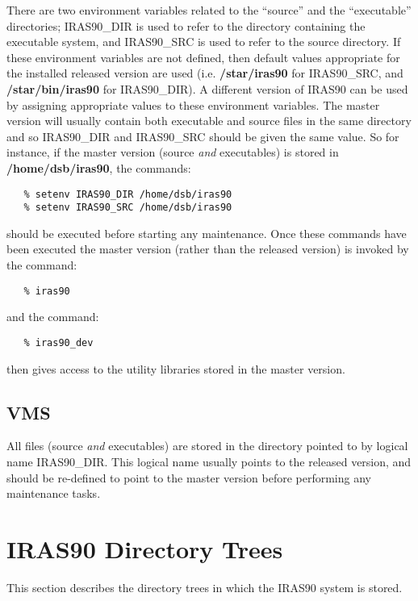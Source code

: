 There are two environment variables related to the ``source'' and the
``executable'' directories; {\small IRAS90\_DIR} is used to refer to the
directory containing the executable system, and {\small IRAS90\_SRC} is used to
refer to the source directory. If these environment variables are not defined,
then default values appropriate for the installed released version are used
(i.e. {\bf /star/iras90} for {\small IRAS90\_SRC}, and {\bf /star/bin/iras90}
for {\small IRAS90\_DIR}). A different version of {\small IRAS90} can be used by
assigning appropriate values to these environment variables. The master version
will usually contain both executable and source files in the same directory
and so {\small IRAS90\_DIR} and {\small IRAS90\_SRC} should be given the same
value. So for instance, if the master version (source {\em and} executables) is 
stored in {\bf /home/dsb/iras90}, the commands:

\small
\begin{verbatim}
   % setenv IRAS90_DIR /home/dsb/iras90
   % setenv IRAS90_SRC /home/dsb/iras90
\end{verbatim}
\normalsize

should be executed before starting any maintenance. Once these commands have
been executed the master version (rather than the released version) is invoked
by the command: 

\small
\begin{verbatim}
   % iras90
\end{verbatim}
\normalsize

and the command:

\small
\begin{verbatim}
   % iras90_dev
\end{verbatim}
\normalsize

then gives access to the utility libraries stored in the master version.

\subsection{VMS}
All files (source {\em and} executables) are stored in the directory pointed to 
by logical name {\small IRAS90\_DIR}. This logical name usually points to the 
released version, and should be re-defined to point to the master version before 
performing any maintenance tasks.

\section{IRAS90 Directory Trees}
This section describes the directory trees in which the {\small IRAS90} system 
is stored.


